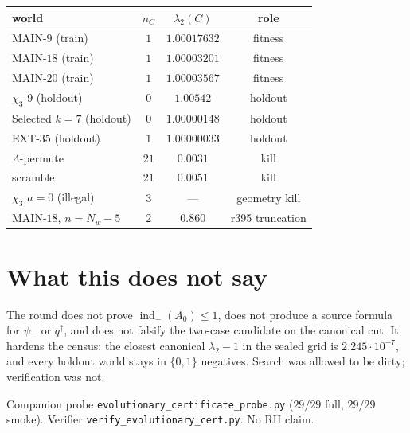 \documentclass[11pt]{article}
\theoremstyle{remark}
\newcommand{\indm}{\operatorname{ind}_{-}}
\begin{document}
\begin{center}
\small
\begin{tabular}{@{}lccc@{}}
\toprule
world & $n_C$ & $\lambda_2(C)$ & role \\
\midrule
MAIN-$9$ (train) & $1$ & $1.00017632$ & fitness \\
MAIN-$18$ (train) & $1$ & $1.00003201$ & fitness \\
MAIN-$20$ (train) & $1$ & $1.00003567$ & fitness \\
$\chi_3$-$9$ (holdout) & $0$ & $1.00542$ & holdout \\
Selected $k=7$ (holdout) & $0$ & $1.00000148$ & holdout \\
EXT-$35$ (holdout) & $1$ & $1.00000033$ & holdout \\
$\Lambda$-permute & $21$ & $0.0031$ & kill \\
scramble & $21$ & $0.0051$ & kill \\
$\chi_3$ $a=0$ (illegal) & $3$ & --- & geometry kill \\
MAIN-$18$, $n=N_w-5$ & $2$ & $0.860$ & r395 truncation \\
\bottomrule
\end{tabular}
\end{center}

\section{What this does not say}

The round does not prove $\indm(A_0)\le 1$, does not produce
a source formula for $\psi_-$ or $q^\dagger$, and does not
falsify the two-case candidate on the canonical cut.
It hardens the census: the closest canonical
$\lambda_2-1$ in the sealed grid is $2.245\cdot 10^{-7}$,
and every holdout world stays in $\{0,1\}$ negatives.
Search was allowed to be dirty; verification was not.

\medskip\noindent
Companion probe \texttt{evolutionary\_certificate\_probe.py}
($29/29$ full, $29/29$ smoke).
Verifier \texttt{verify\_evolutionary\_cert.py}.
No RH claim.
\end{document}
